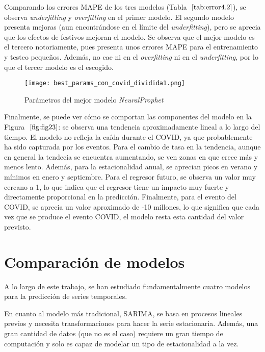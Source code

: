 \documentclass[12pt,twoside]{article}
\begin{document}
Comparando los errores MAPE de los tres modelos (Tabla $~\ref{tab:error4.2}$), se observa \textit{underfitting} y \textit{overfitting} en el primer modelo. El segundo modelo presenta mejoras (aun encontrándose en el límite del \textit{underfitting}), pero se aprecia que los efectos de festivos mejoran el modelo. Se observa que el mejor modelo es el tercero notoriamente, pues presenta unos errores MAPE para el entrenamiento y testeo pequeños. Además, no cae ni en el \textit{overfitting} ni en el \textit{underfitting}, por lo que el tercer modelo es el escogido.



\begin{figure}[h]
    \centering
    \texttt{[image: best\_params\_con\_covid\_dividida1.png]}
    \caption{Parámetros del mejor modelo \textit{NeuralProphet}} 
    \label{fig:fig23}
\end{figure}

Finalmente, se puede ver cómo se comportan las componentes del modelo en la Figura $~\ref{fig:fig23}$: se observa una tendencia aproximadamente lineal a lo largo del tiempo. El modelo no refleja la caída durante el COVID, ya que probablemente ha sido capturada por los eventos. Para el cambio de tasa en la tendencia, aunque en general la tendecia se encuentra aumentando, se ven zonas en que crece más y menos lento. Además, para la estacionalidad anual, se aprecian picos en verano y mínimos en enero y septiembre. Para el regresor futuro, se observa un valor muy cercano a 1, lo que indica que el regresor tiene un impacto muy fuerte y directamente proporcional en la predicción. Finalmente, para el evento del COVID, se aprecia un valor aproximado de -10 millones, lo que significa que cada vez que se produce el evento COVID, el modelo resta esta cantidad del valor previsto.




\newpage
\section{Comparación de modelos}\label{sec:38}

A lo largo de este trabajo, se han estudiado fundamentalmente cuatro modelos para la predicción de series temporales.

En cuanto al modelo más tradicional, SARIMA, se basa en procesos lineales previos y necesita transformaciones para hacer la serie estacionaria. Además, una gran cantidad de datos (que no es el caso) requiere un gran tiempo de computación y solo es capaz de modelar un tipo de estacionalidad a la vez.
\end{document}
